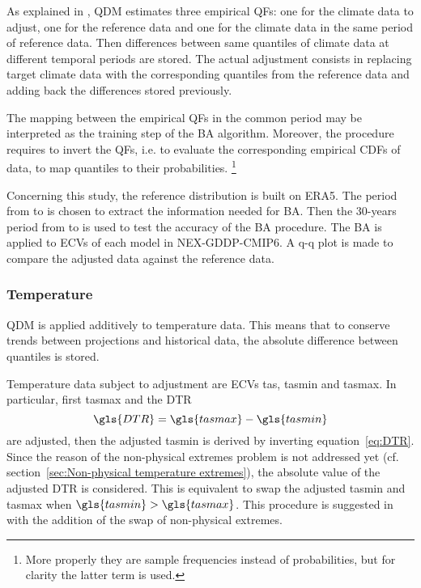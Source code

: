As explained in \cite[6941-6942]{2015CannonBiasCorrection}, \gls{QDM} estimates three empirical \glspl{QF}: one for the climate data to adjust, one for the reference data and one for the climate data in the same period of reference data. Then differences between same quantiles of climate data at different temporal periods are stored. The actual adjustment consists in replacing target climate data with the corresponding quantiles from the reference data and adding back the differences stored previously.

The mapping between the empirical \glspl{QF} in the common period may be interpreted as the training step of the \gls{BA} algorithm. Moreover, the procedure requires to invert the \glspl{QF}, i.e. to evaluate the corresponding empirical \glspl{CDF} of data, to map quantiles to their probabilities.%
\footnote{More properly they are sample frequencies instead of probabilities, but for clarity the latter term is used.}

Concerning this study, the reference distribution is built on ERA5. The period from  to  is chosen to extract the information needed for \gls{BA}. Then the 30-years period from  to  is used to test the accuracy of the \gls{BA} procedure.
The \gls{BA} is applied to \glspl{ECV} of each model in NEX-GDDP-CMIP6. A q-q plot is made to compare the adjusted data against the reference data.



\subsubsection{Temperature}
\Gls{QDM} is applied additively to temperature data. This means that to conserve trends between projections and historical data, the absolute difference between quantiles is stored.

Temperature data subject to adjustment are \glspl{ECV} \gls{tas}, \gls{tasmin} and \gls{tasmax}. In particular, first \gls{tasmax} and the \glsdesc{DTR}
\begin{equation}
  \label{eq:DTR}
  \gls{DTR} = \gls{tasmax} - \gls{tasmin}
\end{equation}
are adjusted, then the adjusted \gls{tasmin} is derived by inverting equation~\eqref{eq:DTR}. Since the reason of the non-physical extremes problem is not addressed yet (cf. section~\ref{sec:Non-physical temperature extremes}), the absolute value of the adjusted \gls{DTR} is considered. This is equivalent to swap the adjusted \gls{tasmin} and \gls{tasmax} when $\gls{tasmin} > \gls{tasmax}$.
This procedure is suggested in \cite[3313]{2012ThrasherTechnicalNote} with the addition of the swap of non-physical extremes.



